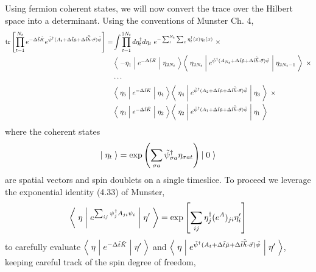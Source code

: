 Using fermion coherent states, we will now convert the trace over the Hilbert space into a determinant.
Using the conventions of Munster Ch. 4,
\begin{align}
	\text{tr}\left[\prod_{t=1}^{N_t} e^{-\Delta \tilde{t}\tilde{K}}  e^{ \tilde{\psi}{}^{\dagger} (A_t + \Delta\tilde{t} \tilde{\mu} + \Delta\tilde{t}\tilde{\vec{h}}\cdot\vec{\sigma}) \tilde{\psi} }\right]
	=& \int \prod_{t=1}^{2N_t} d \eta^{\dagger}_t d\eta_t ~ e^{- \sum_{t}^{N_t}\sum_x \eta^{\dagger}_t(x) \eta_t(x)}~ \times
	\nonumber\\
	&
		\left\langle\; -\eta_1 \;\middle|\; e^{-\Delta \tilde{t}\tilde{K} }\;\middle|\;\eta_{2 N_t}\;\right\rangle
		\left\langle\; \eta_{2 N_t} \;\middle|\; e^{ \tilde{\psi}{}^{\dagger} (A_{N_t} + \Delta\tilde{t}\tilde{\mu} + \Delta\tilde{t}\tilde{\vec{h}}\cdot\vec{\sigma})\tilde{\psi} } \;\middle|\;\eta_{2 N_t-1}\;\right\rangle ~ \times
	\nonumber\\
	&
		\cdots
	\nonumber\\
	&
		\left\langle\; \eta_5 \;\middle|\; e^{-\Delta \tilde{t}\tilde{K} }\;\middle|\;\eta_{4}\;\right\rangle
		\left\langle\; \eta_4 \;\middle|\; e^{ \tilde{\psi}{}^{\dagger} (A_{2} + \Delta\tilde{t}\tilde{\mu} + \Delta\tilde{t}\tilde{\vec{h}}\cdot\vec{\sigma}) \tilde{\psi}} \;\middle|\;\eta_3\;\right\rangle ~ \times
	\nonumber\\
	&
		\left\langle\; \eta_3 \;\middle|\; e^{-\Delta \tilde{t}\tilde{K} }\;\middle|\;\eta_{2}\;\right\rangle
		\left\langle\; \eta_2 \;\middle|\; e^{ \tilde{\psi}{}^{\dagger} (A_{1} + \Delta\tilde{t}\tilde{\mu} + \Delta\tilde{t}\tilde{\vec{h}}\cdot\vec{\sigma}) \tilde{\psi}} \;\middle|\;\eta_1\;\right\rangle
\end{align}
where the coherent states
\begin{equation*}
	\left|\;\eta_t\;\right\rangle = \exp\left( \sum_{\sigma a} \tilde{\psi}^{\dagger}_{\sigma a} \eta_{\sigma a t} \right) \left|\;0\;\right\rangle
\end{equation*}
are spatial vectors and spin doublets on a single timeslice.
To proceed we leverage the exponential identity (4.33) of Munster,
\begin{equation}
	\left\langle\; \eta \;\middle|\; e^{\sum_{ij} \psi^{\dagger}_j A_{ji} \psi_i} \;\middle|\; \eta' \;\right\rangle
	=
	\exp\left[ \sum_{i j} \eta^{\dagger}_j (e^A)_{ji} \eta'_i \right]
\end{equation}
to carefully evaluate $\left\langle\;\eta\;\middle|\; e^{-\Delta \tilde{t}\tilde{K}} \;\middle|\;\eta'\;\right\rangle$ and $\left\langle\;\eta\;\middle|\; e^{\tilde{\psi}{}^{\dagger}(A_t + \Delta \tilde{t} \tilde{\mu} + \Delta\tilde{t}\tilde{\vec{h}}\cdot\vec{\sigma})\tilde{\psi}} \;\middle|\;\eta'\;\right\rangle$, keeping careful track of the spin degree of freedom,
